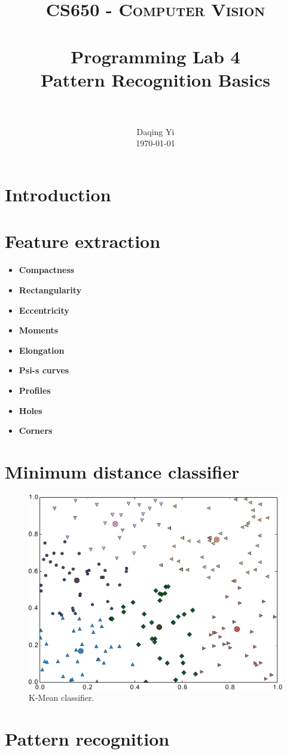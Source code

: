 \documentclass[paper=a4, fontsize=11pt]{scrartcl}
\title{
		\usefont{OT1}{bch}{b}{n}
		\normalfont \normalsize \textsc{CS650 - Computer Vision} \\ [25pt]
		\horrule{0.5pt} \\[0.4cm]
		\huge Programming Lab 4 \\ Pattern Recognition Basics \\
		\horrule{2pt} \\[0.5cm]
}
\author{
		\normalfont 								\normalsize
        Daqing Yi\\[-3pt]		\normalsize
        \today
}
\date{}
\begin{document}
\maketitle

\section{Introduction}
\label{sec:intro}

\section{Feature extraction}
\label{sec:feature_extraction}

\begin{itemize}
\item \textbf{Compactness}
\item \textbf{Rectangularity}
\item \textbf{Eccentricity}
\item \textbf{Moments}
\item \textbf{Elongation}
\item \textbf{Psi-s curves}
\item \textbf{Profiles}
\item \textbf{Holes}
\item \textbf{Corners}
\end{itemize}

\section{Minimum distance classifier}
\label{sec:classifier}

\begin{figure}
\centering
\includegraphics[width=0.7\linewidth]{./figure/kmean}
\caption{K-Mean classifier.}
\label{fig:interclass_variances}
\end{figure}

\section{Pattern recognition}
\label{sec:pattern_recognition}







\end{document}
